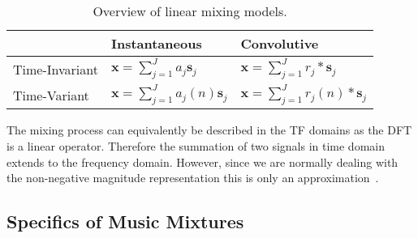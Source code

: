 \begin{table}[]
    \centering
\begin{longtable}[]{lll}
\toprule
\begin{minipage}[b]{0.26\columnwidth}\raggedright
\strut
\end{minipage} & \begin{minipage}[b]{0.42\columnwidth}\raggedright
Instantaneous\strut
\end{minipage} & \begin{minipage}[b]{0.23\columnwidth}\raggedright
Convolutive\strut
\end{minipage}\tabularnewline
\midrule
\endhead
\begin{minipage}[t]{0.26\columnwidth}\raggedright
Time-Invariant\strut
\end{minipage} & \begin{minipage}[t]{0.42\columnwidth}\raggedright
\(\mathbf{x}=\sum_{j=1}^{J}a_j\mathbf{s}_j\)\strut
\end{minipage} & \begin{minipage}[t]{0.23\columnwidth}\raggedright
\(\mathbf{x} = \sum_{j=1}^{J}r_{j} \ast \mathbf{s}_j\)\strut
\end{minipage}\tabularnewline
\begin{minipage}[t]{0.26\columnwidth}\raggedright
Time-Variant\strut
\end{minipage} & \begin{minipage}[t]{0.42\columnwidth}\raggedright
\(\mathbf{x}=\sum_{j=1}^{J}a_j(n)\mathbf{s}_j\)\strut
\end{minipage} & \begin{minipage}[t]{0.23\columnwidth}\raggedright
\(\mathbf{x} = \sum_{j=1}^{J}r_{j}(n) \ast \mathbf{s}_j\)\strut
\end{minipage}\tabularnewline
\bottomrule
\end{longtable}
    \caption{Overview of linear mixing models.}
    \label{tab:mixing_models}
\end{table}

The mixing process can equivalently be described in the TF domains as the {DFT} is a linear operator.
Therefore the summation of two signals in time domain extends to the frequency domain.
However, since we are normally dealing with the non-negative magnitude representation this is only an approximation~\cite{klapuri06}.

\subsection{Specifics of Music Mixtures}
\label{sub:specifics_of_music_mixtures}

